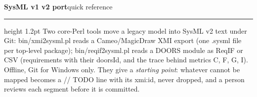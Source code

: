\documentclass[letterpaper]{article}
\newcommand{\cmd}[1]{{\footnotesize\ttfamily #1}}
\begin{document}
\fontsize{10}{12}\selectfont
{\sffamily\bfseries\LARGE SysML v1 \textrightarrow{} v2 port}\hfill{\sffamily\large quick reference}\par\vspace{3pt}
\hrule height 1.2pt\vspace{4pt}
{\small Two core-Perl tools move a legacy model into SysML v2 text under Git: \cmd{bin/xmi2sysml.pl} reads a Cameo/MagicDraw XMI export
(one \cmd{.sysml} file per top-level package); \cmd{bin/reqif2sysml.pl} reads a DOORS module as ReqIF or CSV (requirements with their
\cmd{doorsId}, and the trace behind metrics C, F, G, I). Offline, Git for Windows only. They give a \emph{starting point}: whatever
cannot be mapped becomes a \cmd{// TODO} line with its \cmd{xmi:id}, never dropped, and a person reviews each segment before it is committed.}\par
\end{document}
